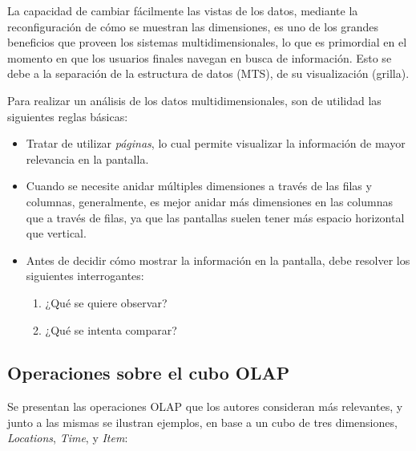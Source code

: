 \documentclass[a4paper,11pt]{article}
\begin{document}
    
    La capacidad de cambiar fácilmente las vistas de los datos, mediante la reconfiguración de cómo se muestran las dimensiones, es uno de los grandes beneficios
    que proveen los sistemas multidimensionales, lo que es primordial en el momento en que los usuarios finales navegan en busca de información.
    Esto se debe a la separación de la estructura de datos (MTS), de su visualización (grilla).
    
    \vspace{0.2in}
    Para realizar un análisis de los datos multidimensionales, son de utilidad las siguientes reglas básicas:
    
    \begin{itemize}
      \item Tratar de utilizar \textit{páginas}, lo cual permite visualizar la información de mayor relevancia en la pantalla.
      \item Cuando se necesite anidar múltiples dimensiones a través de las filas y columnas, generalmente, es mejor anidar más dimensiones en las columnas que
      a través de filas, ya que las pantallas suelen tener más espacio horizontal que vertical.
      \item Antes de decidir cómo mostrar la información en la pantalla, debe resolver los siguientes interrogantes:
        \begin{enumerate}
          \item ¿Qué se quiere observar?
          \item ¿Qué se intenta comparar?
        \end{enumerate}
    \end{itemize}
    
    
    \subsection{Operaciones sobre el cubo OLAP}
    
    Se presentan las operaciones OLAP que los autores consideran más relevantes, y junto a las mismas se ilustran
    ejemplos, en base a un cubo de tres dimensiones, \textit{Locations}, \textit{Time}, y \textit{Item}:
    
\end{document}
